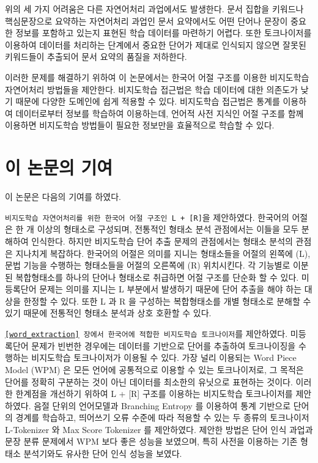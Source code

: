 \documentclass[oneside, ko,phd]{snuthesis_utf8_kor}
\begin{document}
위의 세 가지 어려움은 다른 자연어처리 과업에서도 발생한다.
문서 집합을 키워드나 핵심문장으로 요약하는 자연어처리 과업인 문서 요약에서도 어떤 단어나 문장이 중요한 정보를 포함하고 있는지 표현된 학습 데이터를 마련하기 어렵다.
또한 토크나이저를 이용하여 데이터를 처리하는 단계에서 중요한 단어가 제대로 인식되지 않으면 잘못된 키워드들이 추출되어 문서 요약의 품질을 저하한다.

이러한 문제를 해결하기 위하여 이 논문에서는 한국어 어절 구조를 이용한 비지도학습 자연어처리 방법들을 제안한다.
비지도학습 접근법은 학습 데이터에 대한 의존도가 낮기 때문에 다양한 도메인에 쉽게 적용할 수 있다.
비지도학습 접근법은 통계를 이용하여 데이터로부터 정보를 학습하여 이용하는데, 언어적 사전 지식인 어절 구조를 함께 이용하면 비지도학습 방법들이 필요한 정보만을 효율적으로 학습할 수 있다.

\section{이 논문의 기여}
이 논문은 다음의 기여를 하였다.

\texttt{비지도학습 자연어처리를 위한 한국어 어절 구조인 L + [R]}을 제안하였다.
한국어의 어절은 한 개 이상의 형태소로 구성되며, 전통적인 형태소 분석 관점에서는 이들을 모두 분해하여 인식한다.
하지만 비지도학습 단어 추출 문제의 관점에서는 형태소 분석의 관점은 지나치게 복잡하다.
한국어의 어절은 의미를 지니는 형태소들을 어절의 왼쪽에 (L), 문법 기능을 수행하는 형태소들을 어절의 오른쪽에 (R) 위치시킨다.
각 기능별로 이분된 복합형태소를 하나의 단어나 형태소로 취급하면 어절 구조를 단순화 할 수 있다.
미등록단어 문제는 의미를 지니는 L 부분에서 발생하기 때문에 단어 추출을 해야 하는 대상을 한정할 수 있다.
또한 L 과 R 을 구성하는 복합형태소를 개별 형태소로 분해할 수 있기 때문에 전통적인 형태소 분석과 상호 호환할 수 있다.

\texttt{\ref{word_extraction} 장에서 한국어에 적합한 비지도학습 토크나이저}를 제안하였다.
미등록단어 문제가 빈번한 경우에는 데이터를 기반으로 단어를 추출하여 토크나이징을 수행하는 비지도학습 토크나이저가 이용될 수 있다.
가장 널리 이용되는 Word Piece Model (WPM) 은 모든 언어에 공통적으로 이용할 수 있는 토크나이저로, 그 목적은 단어를 정확히 구분하는 것이 아닌 데이터를 최소한의 유닛으로 표현하는 것이다.
이러한 한계점을 개선하기 위하여 L + [R] 구조를 이용하는 비지도학습 토크나이저를 제안하였다.
음절 단위의 언어모델과 Branching Entropy 를 이용하여 통계 기반으로 단어의 경계를 학습하고, 띄어쓰기 오류 수준에 따라 적용할 수 있는 두 종류의 토크나이저 L-Tokenizer 와 Max Score Tokenizer 를 제안하였다.
제안한 방법은 단어 인식 과업과 문장 분류 문제에서 WPM 보다 좋은 성능을 보였으며, 특히 사전을 이용하는 기존 형태소 분석기와도 유사한 단어 인식 성능을 보였다.
\end{document}
